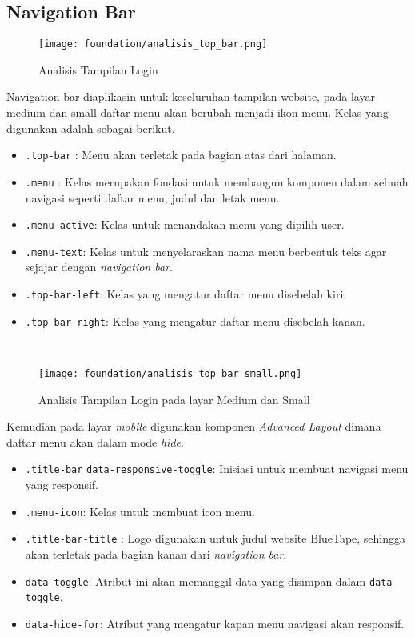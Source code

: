 \subsection{Navigation Bar}
\begin{figure} [H]
	\centering  
	\texttt{[image: foundation/analisis\_top\_bar.png]}  
	\caption{Analisis Tampilan Login} 
\end{figure}
Navigation bar diaplikasin untuk keseluruhan tampilan website, pada layar medium dan small daftar menu akan berubah menjadi ikon menu.
Kelas yang digunakan adalah sebagai berikut.
\begin{itemize}
	\item \texttt{.top-bar}	: Menu akan terletak pada bagian atas dari halaman.	
	\item \texttt{.menu}	: Kelas merupakan fondasi untuk membangun komponen dalam sebuah navigasi seperti daftar menu, judul dan letak menu.
	\item \texttt{.menu-active}: Kelas untuk menandakan menu yang dipilih user.
	\item \texttt{.menu-text}: Kelas untuk menyelaraskan nama menu berbentuk teks agar sejajar dengan \textit{navigation bar}.	
	\item \texttt{.top-bar-left}: Kelas yang mengatur daftar menu disebelah kiri.
	\item \texttt{.top-bar-right}: Kelas yang mengatur daftar menu disebelah kanan.
\end{itemize} \noindent \\
\begin{figure} [H]
	\centering  
	\texttt{[image: foundation/analisis\_top\_bar\_small.png]}  
	\caption{Analisis Tampilan Login pada layar Medium dan Small} 
\end{figure}
Kemudian pada layar \textit{mobile} digunakan komponen \textit{Advanced Layout} dimana daftar menu akan dalam mode \textit{hide}.
\begin{itemize}	
	\item \texttt{.title-bar} \texttt{data-responsive-toggle}: Inisiasi untuk membuat navigasi menu yang responsif. 
	\item \texttt{.menu-icon}: Kelas untuk membuat icon menu.
	\item \texttt{.title-bar-title}	: Logo digunakan untuk judul website BlueTape, sehingga akan terletak pada bagian kanan dari \textit{navigation bar}.
	\item \texttt{data-toggle}: Atribut ini akan memanggil data yang disimpan dalam \texttt{data-toggle}.	
	\item \texttt{data-hide-for}: Atribut yang mengatur kapan menu navigasi akan responsif.
\end{itemize}
 
